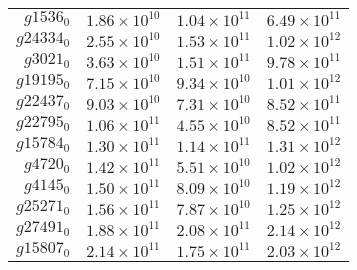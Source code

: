 \begin{tabular}{rrrr}
	$g1536_0 $ & $1.86\times10^{10}$ & $1.04\times10^{11}$ & $6.49\times10^{11}$ \\
	$g24334_0$ & $2.55\times10^{10}$ & $1.53\times10^{11}$ & $1.02\times10^{12}$ \\
    $g3021_0 $ & $3.63\times10^{10}$ & $1.51\times10^{11}$ & $9.78\times10^{11}$ \\
	$g19195_0$ & $7.15\times10^{10}$ & $9.34\times10^{10}$ & $1.01\times10^{12}$ \\
	$g22437_0$ & $9.03\times10^{10}$ & $7.31\times10^{10}$ & $8.52\times10^{11}$ \\
    $g22795_0$ & $1.06\times10^{11}$ & $4.55\times10^{10}$ & $8.52\times10^{11}$ \\
	$g15784_0$ & $1.30\times10^{11}$ & $1.14\times10^{11}$ & $1.31\times10^{12}$ \\
    $g4720_0 $ & $1.42\times10^{11}$ & $5.51\times10^{10}$ & $1.02\times10^{12}$ \\
	$g4145_0 $ & $1.50\times10^{11}$ & $8.09\times10^{10}$ & $1.19\times10^{12}$ \\
	$g25271_0$ & $1.56\times10^{11}$ & $7.87\times10^{10}$ & $1.25\times10^{12}$ \\
	$g27491_0$ & $1.88\times10^{11}$ & $2.08\times10^{11}$ & $2.14\times10^{12}$ \\
	$g15807_0$ & $2.14\times10^{11}$ & $1.75\times10^{11}$ & $2.03\times10^{12}$ \\
	\hline
\end{tabular}
